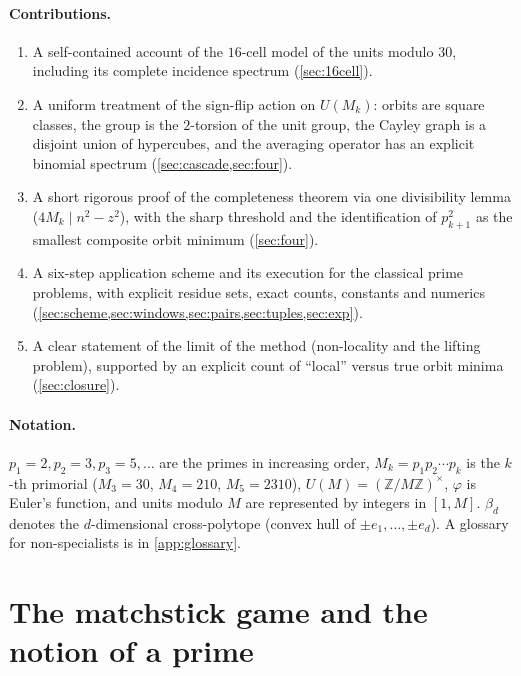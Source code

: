\documentclass[11pt,a4paper]{article}
\theoremstyle{plain}
\theoremstyle{definition}
\theoremstyle{remark}
\newcommand{\Z}{\mathbb{Z}}
\begin{document}
\paragraph{Contributions.}
\begin{enumerate}[leftmargin=*,itemsep=1pt]
\item A self-contained account of the $16$-cell model of the units modulo $30$,
including its complete incidence spectrum (\cref{sec:16cell}).
\item A uniform treatment of the sign-flip action on $U(M_k)$: orbits are
square classes, the group is the $2$-torsion of the unit group, the Cayley
graph is a disjoint union of hypercubes, and the averaging operator has an
explicit binomial spectrum (\cref{sec:cascade,sec:four}).
\item A short rigorous proof of the completeness theorem via one divisibility
lemma ($4M_k\mid n^2-z^2$), with the sharp threshold and the identification of
$p_{k+1}^2$ as the smallest composite orbit minimum (\cref{sec:four}).
\item A six-step application scheme and its execution for the classical prime
problems, with explicit residue sets, exact counts, constants and numerics
(\cref{sec:scheme,sec:windows,sec:pairs,sec:tuples,sec:exp}).
\item A clear statement of the limit of the method (non-locality and the
lifting problem), supported by an explicit count of ``local'' versus true orbit
minima (\cref{sec:closure}).
\end{enumerate}

\paragraph{Notation.} $p_1=2,p_2=3,p_3=5,\dots$ are the primes in increasing
order, $M_k=p_1p_2\cdots p_k$ is the $k$-th primorial ($M_3=30$, $M_4=210$,
$M_5=2310$), $U(M)=(\Z/M\Z)^\times$, $\varphi$ is Euler's function, and units
modulo $M$ are represented by integers in $[1,M]$. $\beta_d$ denotes the
$d$-dimensional cross-polytope (convex hull of $\pm e_1,\dots,\pm e_d$).
A glossary for non-specialists is in \cref{app:glossary}.

\section{The matchstick game and the notion of a prime}\label{sec:game}
\end{document}
